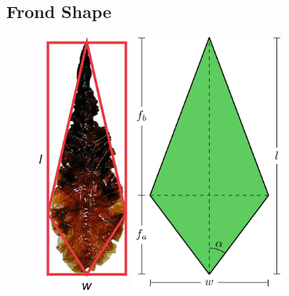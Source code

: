 \documentclass[ms,cpyr,lof,lot]{uathesis}
\providecommand{\DIFaddbeginFL}{} %
\providecommand{\DIFaddendFL}{} %
\providecommand{\DIFdelbeginFL}{} %
\providecommand{\DIFdelendFL}{} %
\newcommand{\DIFscaledelfig}{0.5}
\newlength{\DIFdelgraphicswidth} %
\newlength{\DIFdelgraphicsheight} %
\newcommand{\DIFaddincludegraphics}[2][]{{\color{blue}\fbox{\DIFOincludegraphics[#1]{#2}}}} %
\newcommand{\DIFdelincludegraphics}[2][]{%
\sbox{\DIFdelgraphicsbox}{\DIFOincludegraphics[#1]{#2}}%
\settoboxwidth{\DIFdelgraphicswidth}{\DIFdelgraphicsbox} %
\settoboxtotalheight{\DIFdelgraphicsheight}{\DIFdelgraphicsbox} %
\scalebox{\DIFscaledelfig}{%
\parbox[b]{\DIFdelgraphicswidth}{\usebox{\DIFdelgraphicsbox}\\[-\baselineskip] \rule{\DIFdelgraphicswidth}{0em}}\llap{\resizebox{\DIFdelgraphicswidth}{\DIFdelgraphicsheight}{%
\setlength{\unitlength}{\DIFdelgraphicswidth}%
\begin{picture}(1,1)%
\thicklines\linethickness{2pt} %
{\color[rgb]{1,0,0}\put(0,0){\framebox(1,1){}}}%
{\color[rgb]{1,0,0}\put(0,0){\line( 1,1){1}}}%
{\color[rgb]{1,0,0}\put(0,1){\line(1,-1){1}}}%
\end{picture}%
}\hspace*{3pt}}} %
} %
\DeclareRobustCommand{\DIFaddbeginFL}{\DIFOaddbeginFL \let\includegraphics\DIFaddincludegraphics} %
\DeclareRobustCommand{\DIFaddendFL}{\DIFOaddendFL \let\includegraphics\DIFOincludegraphics} %
\DeclareRobustCommand{\DIFdelbeginFL}{\DIFOdelbeginFL \let\includegraphics\DIFdelincludegraphics} %
\DeclareRobustCommand{\DIFdelendFL}{\DIFOaddendFL \let\includegraphics\DIFOincludegraphics} %
\begin{document}
\subsection{Frond Shape}
\label{sec:shape}

\begin{figure}[h]
	\centering
  \includegraphics[width=1.2in]{kelp_photo/kite}
  \qquad
	\includegraphics[width=2in]{frond}
	\DIFdelbeginFL %
\DIFdelendFL \DIFaddbeginFL {}
	\DIFaddendFL \label{fig:frond}
\end{figure}
\end{document}
